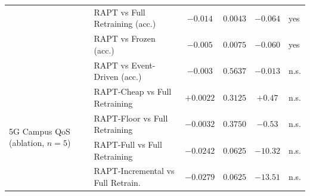 \begin{table}[t]
\begin{tabular}{llcccl}
 & RAPT vs Full Retraining (acc.)   & $-0.014$  & $0.0043$ & $-0.064$ & yes \\
 & RAPT vs Frozen (acc.)            & $-0.005$  & $0.0075$ & $-0.060$ & yes \\
 & RAPT vs Event-Driven (acc.)      & $-0.003$  & $0.5637$ & $-0.013$ & n.s. \\
\midrule
\multirow{4}{*}{5G Campus QoS (ablation, $n=5$)}
 & RAPT-Cheap vs Full Retraining    & $+0.0022$ & $0.3125$ & $+0.47$ & n.s. \\
 & RAPT-Floor vs Full Retraining    & $-0.0032$ & $0.3750$ & $-0.53$ & n.s. \\
 & RAPT-Full vs Full Retraining     & $-0.0242$ & $0.0625$ & $-10.32$ & n.s. \\
 & RAPT-Incremental vs Full Retrain.& $-0.0279$ & $0.0625$ & $-13.51$ & n.s. \\
\bottomrule
\end{tabular}
\end{table}


